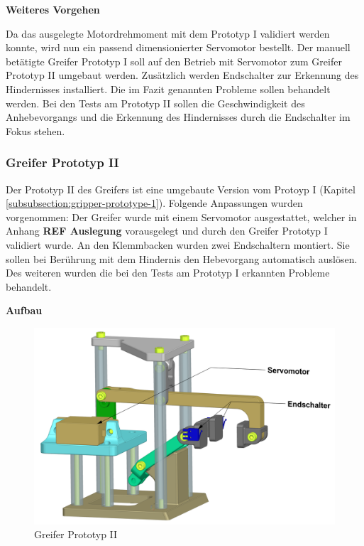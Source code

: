 \textbf{Weiteres Vorgehen}

Da das ausgelegte Motordrehmoment mit dem Prototyp I validiert werden konnte, wird nun ein passend dimensionierter Servomotor bestellt. Der manuell betätigte Greifer Prototyp I soll auf den Betrieb mit Servomotor zum Greifer Prototyp II umgebaut werden. Zusätzlich werden Endschalter zur Erkennung des Hindernisses installiert. Die im Fazit genannten Probleme sollen behandelt werden.
Bei den Tests am Prototyp II sollen die Geschwindigkeit des Anhebevorgangs und die Erkennung des Hindernisses durch die Endschalter im Fokus stehen.


\subsubsection{Greifer Prototyp II}
\label{subsubsection:gripper-prototype-2}

Der Prototyp II des Greifers ist eine umgebaute Version vom Protoyp I (Kapitel \ref{subsubsection:gripper-prototype-1}). Folgende Anpassungen wurden vorgenommen: Der Greifer wurde mit einem Servomotor ausgestattet, welcher in Anhang \textbf{REF Auslegung} vorausgelegt und durch den Greifer Prototyp I validiert wurde. An den Klemmbacken wurden zwei Endschaltern montiert. Sie sollen bei Berührung mit dem Hindernis den Hebevorgang automatisch auslösen. Des weiteren wurden die bei den Tests am Prototyp I erkannten Probleme behandelt.

\textbf{Aufbau}

\begin{figure}[H]
\centering
\includegraphics[width=1.0\textwidth]{assets/greifer-prototyp/Greifer_Prototyp_2_trimetrisch.png}
\caption{Greifer Prototyp II}
\label{fig:gripper-prototype-2-trimetric}
\end{figure}

